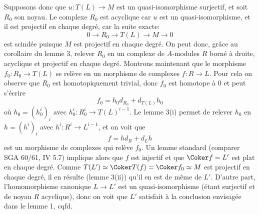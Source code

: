 Supposons donc que $u:T(L)\to M$ est un quasi-isomorphisme surjectif, et soit $R_0$ son noyau. Le complexe $R_0$ est acyclique car $u$ est un quasi-isomorphisme, et il est projectif en chaque degré, car la suite exacte:
\[
0\longrightarrow R_0\longrightarrow T(L)\longrightarrow M\longrightarrow0
\]
est scindée puisque $M$ est projectif en chaque degré. On peut donc, grâce au corollaire du lemme 3, relever $R_0$ en un complexe de $A$-modules $R$ borné à droite, acyclique et projectif en chaque degré. Montrons maintenant que le morphisme $f_0:R_0\to T(L)$ se relève en un morphisme de complexes $f:R\to L$. Pour cela on observe que $R_0$ est homotopiquement trivial, donc $f_0$ est homotope à $0$ et peut s'écrire
\[
f_0=h_0d_{R_0}+d_{T(L)}h_0
\]
où $h_0=(h_0^i)_i$ avec $h_0^i:R_0^i\to T(L)^{i-1}$. Le lemme 3(i) permet de relever $h_0$ en $h=(h^i)_i$ avec $h^i:R^i\to L^{i-1}$, 
et on
voit que
\[
f=hd_R+d_Lh
\]
est un morphisme de complexes qui relève $f_0$. Un lemme standard (comparer SGA 60/61, IV 5.7) implique alors que $f$ est injectif et que $\Coker f=L'$ est plat en chaque degré. Comme $T(L')\simeq\Coker T(f)=\Coker f_0\simeq M$ est projectif en chaque degré, il en résulte (lemme 3(ii)) qu'il en est de même de $L'$. D'autre part, l'homomorphisme canonique $L\to L'$ est un quasi-isomorphisme (étant surjectif et de noyau $R$ acyclique), donc on voit que $L'$ satisfait à la conclusion envisagée dans le lemme 1, cqfd.

\renewcommand{\fr}{\operatorname{fr}}\renewcommand{\Fr}{\operatorname{Fr}}

